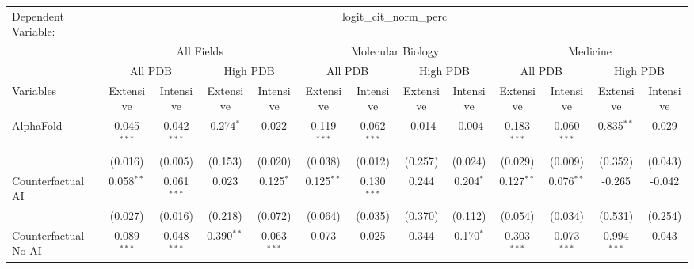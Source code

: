 \begingroup
\centering
\begin{tabular}{lcccccccccccc}
   \tabularnewline \midrule \midrule
   Dependent Variable: & \multicolumn{12}{c}{logit\_cit\_norm\_perc}\\
 & \multicolumn{4}{c}{All Fields} & \multicolumn{4}{c}{Molecular Biology} & \multicolumn{4}{c}{Medicine} \\
\cmidrule(lr){2-5} \cmidrule(lr){6-9} \cmidrule(lr){10-13}
 & \multicolumn{2}{c}{All PDB} & \multicolumn{2}{c}{High PDB} & \multicolumn{2}{c}{All PDB} & \multicolumn{2}{c}{High PDB} & \multicolumn{2}{c}{All PDB} & \multicolumn{2}{c}{High PDB} \\
\cmidrule(lr){2-3} \cmidrule(lr){4-5} \cmidrule(lr){6-7} \cmidrule(lr){8-9} \cmidrule(lr){10-11} \cmidrule(lr){12-13}
Variables & \multicolumn{1}{c}{Extensive} & \multicolumn{1}{c}{Intensive} & \multicolumn{1}{c}{Extensive} & \multicolumn{1}{c}{Intensive} & \multicolumn{1}{c}{Extensive} & \multicolumn{1}{c}{Intensive} & \multicolumn{1}{c}{Extensive} & \multicolumn{1}{c}{Intensive} & \multicolumn{1}{c}{Extensive} & \multicolumn{1}{c}{Intensive} & \multicolumn{1}{c}{Extensive} & \multicolumn{1}{c}{Intensive} \\
\cmidrule(lr){1-1}\cmidrule(lr){2-2} \cmidrule(lr){3-3} \cmidrule(lr){4-4} \cmidrule(lr){5-5} \cmidrule(lr){6-6} \cmidrule(lr){7-7} \cmidrule(lr){8-8} \cmidrule(lr){9-9} \cmidrule(lr){10-10} \cmidrule(lr){11-11} \cmidrule(lr){12-12} \cmidrule(lr){13-13}
   AlphaFold                                & 0.045$^{***}$ & 0.042$^{***}$  & 0.274$^{*}$  & 0.022          & 0.119$^{***}$ & 0.062$^{***}$  & -0.014  & -0.004        & 0.183$^{***}$ & 0.060$^{***}$  & 0.835$^{**}$  & 0.029\\   
                                            & (0.016)       & (0.005)        & (0.153)      & (0.020)        & (0.038)       & (0.012)        & (0.257) & (0.024)       & (0.029)       & (0.009)        & (0.352)       & (0.043)\\   
   Counterfactual AI                        & 0.058$^{**}$  & 0.061$^{***}$  & 0.023        & 0.125$^{*}$    & 0.125$^{**}$  & 0.130$^{***}$  & 0.244   & 0.204$^{*}$   & 0.127$^{**}$  & 0.076$^{**}$   & -0.265        & -0.042\\   
                                            & (0.027)       & (0.016)        & (0.218)      & (0.072)        & (0.064)       & (0.035)        & (0.370) & (0.112)       & (0.054)       & (0.034)        & (0.531)       & (0.254)\\   
   Counterfactual No AI                     & 0.089$^{***}$ & 0.048$^{***}$  & 0.390$^{**}$ & 0.063$^{***}$  & 0.073         & 0.025          & 0.344   & 0.170$^{*}$   & 0.303$^{***}$ & 0.073$^{***}$  & 0.994$^{***}$ & 0.043\\   

\end{tabular}
